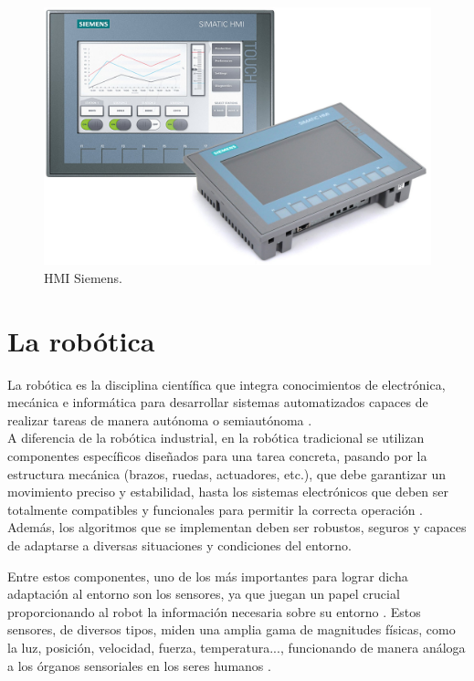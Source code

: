 \begin{figure} [h!]
  \begin{center}
    \includegraphics[width=13cm]{figs/HMI}
  \end{center}
  \caption{\centering HMI Siemens.}
  \label{fig:HMI}
\end{figure} 

\section{La robótica}
\label{sec:segundaseccion} %

La robótica es la disciplina científica que integra conocimientos de electrónica, mecánica e informática para desarrollar sistemas automatizados capaces de realizar tareas de manera autónoma o semiautónoma \cite{definicion_robot}. \\

A diferencia de la robótica industrial, en la robótica tradicional se utilizan componentes específicos diseñados para una tarea concreta, pasando por la estructura mecánica (brazos, ruedas, actuadores, etc.), que debe garantizar un movimiento preciso y estabilidad, hasta los sistemas electrónicos que deben ser totalmente compatibles y funcionales para permitir la correcta operación \cite{definicion_robot_2}. Además, los algoritmos que se implementan deben ser robustos, seguros y capaces de adaptarse a diversas situaciones y condiciones del entorno.

Entre estos componentes, uno de los más importantes para lograr dicha adaptación al entorno son los sensores, ya que juegan un papel crucial proporcionando al robot la información necesaria sobre su entorno \cite{definicion_robot_2}. Estos sensores, de diversos tipos, miden una amplia gama de magnitudes físicas, como la luz, posición, velocidad, fuerza, temperatura..., funcionando de manera análoga a los órganos sensoriales en los seres humanos \cite{definicion_robot_2}. 

